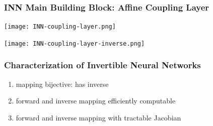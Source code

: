 \documentclass[aspectratio=43]{beamer}
\begin{document}
\begin{frame}
	\frametitle{INN Main Building Block: Affine Coupling Layer}
			\begin{description}
			\item<1->[forward process:]\texttt{[image: INN-coupling-layer.png]}
			\item<1->[inverse process:]\texttt{[image: INN-coupling-layer-inverse.png]}\cite{Ardizzone2_2019}
			\end{description}
\end{frame}

\begin{frame}
	\frametitle{Characterization of Invertible Neural Networks}
	\begin{enumerate}
		\item mapping bijective: \alert{has inverse}
		\item forward and inverse mapping \alert{efficiently computable}
		\item forward and inverse mapping with \alert{tractable Jacobian}
	\end{enumerate}
\end{frame}
\end{document}
